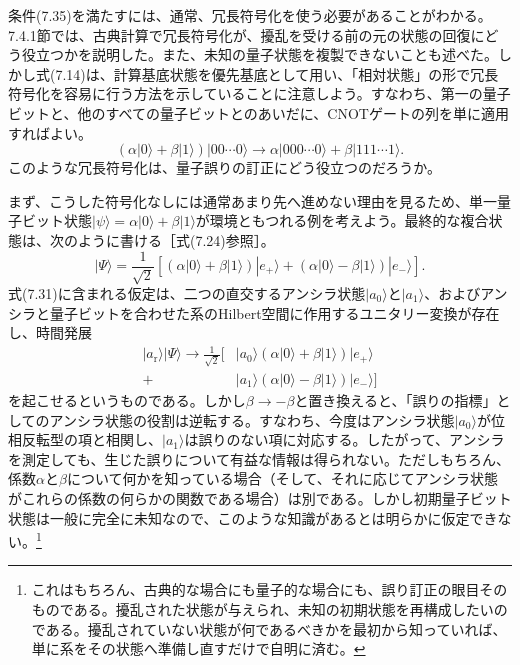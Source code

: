 条件(7.35)を満たすには、通常、冗長符号化を使う必要があることがわかる。7.4.1節では、古典計算で冗長符号化が、擾乱を受ける前の元の状態の回復にどう役立つかを説明した。また、未知の量子状態を複製できないことも述べた。しかし式(7.14)は、計算基底状態を優先基底として用い、「相対状態」の形で冗長符号化を容易に行う方法を示していることに注意しよう。すなわち、第一の量子ビットと、他のすべての量子ビットとのあいだに、CNOTゲートの列を単に適用すればよい。
\begin{equation}(\alpha|0\rangle+\beta|1\rangle)|00\cdots0\rangle\longrightarrow\alpha|000\cdots0\rangle+\beta|111\cdots1\rangle.\tag{7.36}\end{equation}
このような冗長符号化は、量子誤りの訂正にどう役立つのだろうか。

まず、こうした符号化なしには通常あまり先へ進めない理由を見るため、単一量子ビット状態$|\psi\rangle=\alpha|0\rangle+\beta|1\rangle$が環境ともつれる例を考えよう。最終的な複合状態は、次のように書ける［式(7.24)参照］。
\begin{equation}|\Psi\rangle=\frac1{\sqrt2}[(\alpha|0\rangle+\beta|1\rangle)|e_+\rangle+(\alpha|0\rangle-\beta|1\rangle)|e_-\rangle].\tag{7.37}\end{equation}
式(7.31)に含まれる仮定は、二つの直交するアンシラ状態$|a_0\rangle$と$|a_1\rangle$、およびアンシラと量子ビットを合わせた系のHilbert空間に作用するユニタリー変換が存在し、時間発展
\hypertarget{srcpage:316}{}\label{srcpage:316}
\begin{equation}\begin{aligned}|a_{\mathrm r}\rangle|\Psi\rangle\longrightarrow\frac1{\sqrt2}\big[&|a_0\rangle(\alpha|0\rangle+\beta|1\rangle)|e_+\rangle\\+&|a_1\rangle(\alpha|0\rangle-\beta|1\rangle)|e_-\rangle\big]\end{aligned}\tag{7.38}\end{equation}
を起こせるというものである。しかし$\beta\longrightarrow-\beta$と置き換えると、「誤りの指標」としてのアンシラ状態の役割は逆転する。すなわち、今度はアンシラ状態$|a_0\rangle$が位相反転型の項と相関し、$|a_1\rangle$は誤りのない項に対応する。したがって、アンシラを測定しても、生じた誤りについて有益な情報は得られない。ただしもちろん、係数$\alpha$と$\beta$について何かを知っている場合（そして、それに応じてアンシラ状態がこれらの係数の何らかの関数である場合）は別である。しかし初期量子ビット状態は一般に完全に未知なので、このような知識があるとは明らかに仮定できない。\footnote{これはもちろん、古典的な場合にも量子的な場合にも、誤り訂正の眼目そのものである。擾乱された状態が与えられ、未知の初期状態を再構成したいのである。擾乱されていない状態が何であるべきかを最初から知っていれば、単に系をその状態へ準備し直すだけで自明に済む。}

